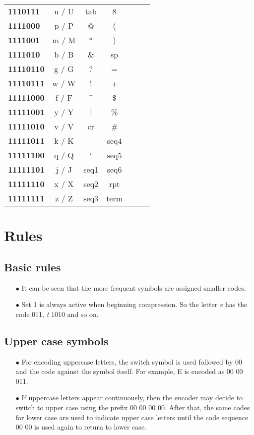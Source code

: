 \documentclass[]{article}
\begin{document}
\begin{center}
\begin{tabular}{ | l | c | c | c | c | c | c | }
		\textbf{1110111} & u / U & tab & 8 & & \\ \cline{1-4}
		\textbf{1111000} & p / P & @ & ( & & \\ \cline{1-4}
		\textbf{1111001} & m / M & * & ) & & \\ \cline{1-4}
		\textbf{1111010} & b / B & \& & sp & & \\ \cline{1-4}
		\textbf{11110110} & g / G & ? & = & & \\ \cline{1-4}
		\textbf{11110111} & w / W & ! & + & & \\ \cline{1-4}
		\textbf{11111000} & f / F & \^{} & \$ & & \\ \cline{1-4}
		\textbf{11111001} & y / Y & $|$ & \% & & \\ \cline{1-4}
		\textbf{11111010} & v / V & cr & \# & & \\ \cline{1-4}
		\textbf{11111011} & k / K & ~ & seq4 & & \\ \cline{1-4}
		\textbf{11111100} & q / Q & ` & seq5 & & \\ \cline{1-4}
		\textbf{11111101} & j / J & seq1 & seq6 & & \\ \cline{1-4}
		\textbf{11111110} & x / X & seq2 & rpt & & \\ \cline{1-4}
		\textbf{11111111} & z / Z & seq3 & term & & \\ \hline
	\end{tabular}
\end{center}

\section{Rules}

\subsection{Basic rules}
\begin{itemize}
	\item[$\bullet$] It can be seen that the more frequent symbols are assigned smaller codes.
	\item[$\bullet$] Set 1 is always active when beginning compression. So the letter \emph{e} has the code 011, \emph{t} 1010 and so on.
\end{itemize}

\subsection{Upper case symbols}
\begin{itemize}
	\item[$\bullet$] For encoding uppercase letters, the switch symbol is used followed by 00 and the code against the symbol itself. For example, E is encoded as 00 00 011.
	\item[$\bullet$] If uppercase letters appear continuously, then the encoder may decide to switch to upper case using the prefix 00 00 00 00. After that, the same codes for lower case are used to indicate upper case letters until the code sequence 00 00 is used again to return to lower case.
\end{itemize}
\end{document}
